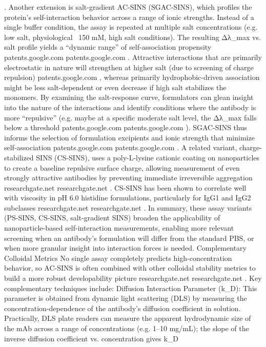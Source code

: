 . Another extension is salt-gradient AC-SINS (SGAC-SINS), which profiles the protein’s self-interaction behavior across a range of ionic strengths. Instead of a single buffer condition, the assay is repeated at multiple salt concentrations (e.g. low salt, physiological ~150 mM, high salt conditions). The resulting Δλ_max vs. salt profile yields a “dynamic range” of self-association propensity
patents.google.com
patents.google.com
. Attractive interactions that are primarily electrostatic in nature will strengthen at higher salt (due to screening of charge repulsion)
patents.google.com
, whereas primarily hydrophobic-driven association might be less salt-dependent or even decrease if high salt stabilizes the monomers. By examining the salt-response curve, formulators can glean insight into the nature of the interactions and identify conditions where the antibody is more “repulsive” (e.g. maybe at a specific moderate salt level, the Δλ_max falls below a threshold
patents.google.com
patents.google.com
). SGAC-SINS thus informs the selection of formulation excipients and ionic strength that minimize self-association
patents.google.com
patents.google.com
. A related variant, charge-stabilized SINS (CS-SINS), uses a poly-L-lysine cationic coating on nanoparticles to create a baseline repulsive surface charge, allowing measurement of even strongly attractive antibodies by preventing immediate irreversible aggregation
researchgate.net
researchgate.net
. CS-SINS has been shown to correlate well with viscosity in pH 6.0 histidine formulations, particularly for IgG1 and IgG2 subclasses
researchgate.net
researchgate.net
. In summary, these assay variants (PS-SINS, CS-SINS, salt-gradient SINS) broaden the applicability of nanoparticle-based self-interaction measurements, enabling more relevant screening when an antibody’s formulation will differ from the standard PBS, or when more granular insight into interaction forces is needed.
Complementary Colloidal Metrics
No single assay completely predicts high-concentration behavior, so AC-SINS is often combined with other colloidal stability metrics to build a more robust developability picture
researchgate.net
researchgate.net
. Key complementary techniques include:
Diffusion Interaction Parameter (k_D): This parameter is obtained from dynamic light scattering (DLS) by measuring the concentration-dependence of the antibody’s diffusion coefficient in solution. Practically, DLS plate readers can measure the apparent hydrodynamic size of the mAb across a range of concentrations (e.g. 1–10 mg/mL); the slope of the inverse diffusion coefficient vs. concentration gives k_D
